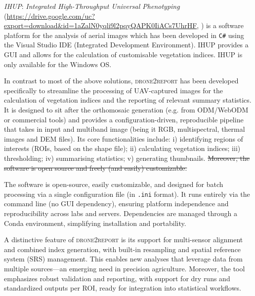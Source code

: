 \documentclass[drones,technicalnote,accept,pdftex,moreauthors]{Definitions/mdpi}
\providecommand{\DIFdel}[1]{{\protect\color{red}\sout{#1}}}                      %
\providecommand{\DIFdelbegin}{} %
\providecommand{\DIFdelend}{} %
\newcommand{\DIFscaledelfig}{0.5}
\newlength{\DIFdelgraphicswidth} %
\newlength{\DIFdelgraphicsheight} %
\newcommand{\DIFdelincludegraphics}[2][]{%
\sbox{\DIFdelgraphicsbox}{\DIFOincludegraphics[#1]{#2}}%
\settoboxwidth{\DIFdelgraphicswidth}{\DIFdelgraphicsbox} %
\settoboxtotalheight{\DIFdelgraphicsheight}{\DIFdelgraphicsbox} %
\scalebox{\DIFscaledelfig}{%
\parbox[b]{\DIFdelgraphicswidth}{\usebox{\DIFdelgraphicsbox}\\[-\baselineskip] \rule{\DIFdelgraphicswidth}{0em}}\llap{\resizebox{\DIFdelgraphicswidth}{\DIFdelgraphicsheight}{%
\setlength{\unitlength}{\DIFdelgraphicswidth}%
\begin{picture}(1,1)%
\thicklines\linethickness{2pt} %
{\color[rgb]{1,0,0}\put(0,0){\framebox(1,1){}}}%
{\color[rgb]{1,0,0}\put(0,0){\line( 1,1){1}}}%
{\color[rgb]{1,0,0}\put(0,1){\line(1,-1){1}}}%
\end{picture}%
}\hspace*{3pt}}} %
} %
\DeclareRobustCommand{\DIFdelbegin}{\DIFOdelbegin \let\includegraphics\DIFdelincludegraphics} %
\DeclareRobustCommand{\DIFdelend}{\DIFOaddend \let\includegraphics\DIFOincludegraphics} %
\begin{document}
\textit{IHUP}: \textit{Integrated High-Throughput Universal Phenotyping} (\url{https://drive.google.com/uc?export=download&id=1aZalN0yqli9l2pqyQAPK0IiACs7UhrHF}, \cite{wang2024ihup}) is a software platform for the analysis of aerial images which has been developed in \verb|C#| using the Visual Studio IDE (Integrated Development Environment). IHUP provides a GUI and allows for the calculation of customisable vegetation indices. IHUP is only available for the Windows OS.

\bigskip

In contrast to most of the above solutions, \textsc{drone2report} has been developed specifically to streamline the processing of UAV-captured images for the calculation of vegetation indices and the reporting of relevant summary statistics.
It is designed to sit after the orthomosaic generation (e.g. from ODM/WebODM or commercial tools) and provides a configuration-driven, reproducible pipeline that takes in input and multiband image (being it RGB, multispectral, thermal images and DEM files).  Its core functionalities include: i) identifying regions of interests (ROIs, based on the shape file); ii) calculating vegetation indices; iii) thresholding; iv) summarising statistics; v) generating thumbnails.
\DIFdelbegin \DIFdel{Moreover, the software is open source and freely (and easily) customizable.
}\DIFdelend %

The software is open-source, easily customizable, and designed for batch processing via a single configuration file (in \texttt{.ini} format). It runs entirely via the command line (no GUI dependency), ensuring platform independence and reproducibility across labs and servers. Dependencies are managed through a Conda environment, simplifying installation and portability.

A distinctive feature of \textsc{drone2report} is its support for multi-sensor alignment and combined index generation, with built-in resampling and spatial reference system (SRS) management. This enables new analyses that leverage data from multiple sources—an emerging need in precision agriculture. Moreover, the tool emphasizes robust validation and reporting, with support for dry runs and standardized outputs per ROI, ready for integration into statistical workflows.
\end{document}
